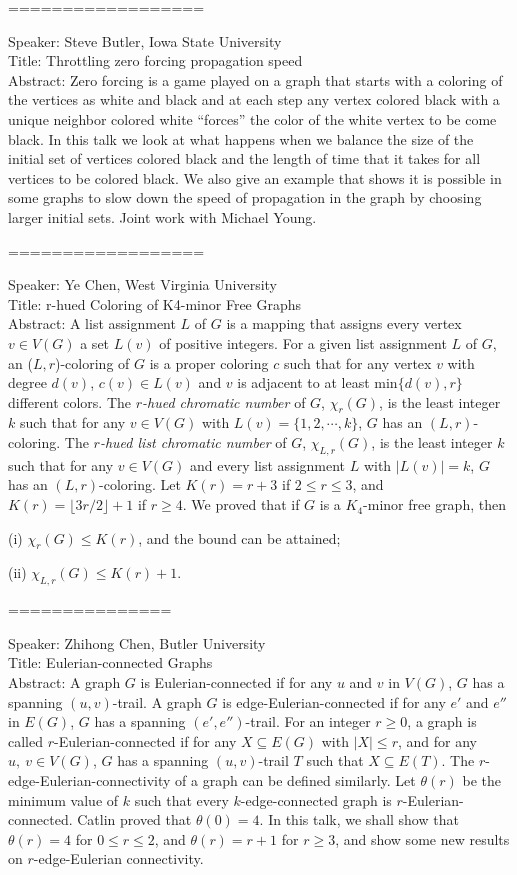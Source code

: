 \documentclass[11pt]{article}
\begin{document}
==================

Speaker: Steve Butler, Iowa State University\\
Title:  Throttling zero forcing propagation speed \\
Abstract:  Zero forcing is a game played on a graph that starts with a
coloring of the vertices as white and black and at each step any vertex
colored black with a unique neighbor colored white ``forces'' the color of
the white vertex to be come black.  In this talk we look at what happens
when we balance the size of the initial set of vertices colored black and
the length of time that it takes for all vertices to be colored black.  We
also give an example that shows it is possible in some graphs to slow down
the speed of propagation in the graph by choosing larger initial sets.
Joint work with Michael Young.


==================

Speaker: Ye Chen, West Virginia University\\
Title: r-hued Coloring of K4-minor Free Graphs\\
Abstract:  A list assignment $L$ of $G$ is a mapping that assigns every
vertex $v\in V(G)$ a set $L(v)$ of positive integers. For a given list
assignment $L$ of $G$, an ($L,r$)-coloring of $G$ is a proper coloring $c$
such that for any vertex $v$ with degree $d(v)$, $c(v)\in L(v)$ and $v$ is
adjacent to at least min$\{d(v),r\}$ different colors. The {\it $r$-hued
chromatic number} of $G$, $\chi_{r}(G)$, is the least integer $k$ such that
for any $v \in V(G)$ with $L(v) = \{1,2,\cdots,k\}$, $G$ has an
$(L,r)$-coloring. The {\it $r$-hued list chromatic number} of $G$,
$\chi_{L,r}(G)$, is the least integer $k$ such that for any $v \in V(G)$ and
every list assignment $L$ with $|L(v)| = k$, $G$ has an $(L,r)$-coloring.
Let $K(r)=r+3$ if $2 \le r \le 3$, and  $K(r)=\lfloor 3r/2\rfloor+1$ if
$r\ge 4$. We proved that if $G$ is a $K_4$-minor free graph, then

(i) $\chi_r(G) \le K(r)$, and the bound can be attained;

(ii) $\chi_{L,r}(G) \le K(r)+1$.


===============

Speaker: Zhihong Chen, Butler University\\
Title: Eulerian-connected Graphs \\
Abstract:  A graph $G$ is Eulerian-connected if for any $u$ and $v$ in
$V(G)$, $G$ has a spanning $(u,v)$-trail.
A graph $G$ is edge-Eulerian-connected if for any $e'$ and $e''$ in $E(G)$,
$G$ has a spanning $(e',e'')$-trail.
For an integer $r\ge 0$, a graph is called $r$-Eulerian-connected if for any
$X\subseteq E(G)$ with $|X|\le r$,
and for any $u,\ v \in V(G)$, 
$G$ has a spanning $(u,v)$-trail $T$ such that $X\subseteq E(T)$. The
$r$-edge-Eulerian-connectivity of a graph can be defined similarly.
 Let $\theta (r)$ be the minimum value of $k$ such
that every $k$-edge-connected graph is $r$-Eulerian-connected.
 Catlin proved that $\theta(0)=4$. In this talk, we shall show that
$\theta(r)=4$ for $0\le r\le 2$, and $\theta(r)=r+1$ for $r\ge 3$, and show
 some new results on $r$-edge-Eulerian connectivity. 
\end{document}
